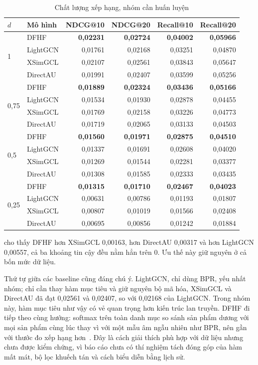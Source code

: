 \begin{table}[H]
\centering
\small
\begin{tabular}{@{}llrrrr@{}}
\toprule
$d$ & Mô hình & NDCG@10 & NDCG@20 & Recall@10 & Recall@20 \\
\midrule
\multirow{4}{*}{1} & DFHF & \textbf{0,02231} & \textbf{0,02724} & \textbf{0,04002} & \textbf{0,05966} \\
 & LightGCN & 0,01761 & 0,02168 & 0,03251 & 0,04870 \\
 & XSimGCL & 0,02107 & 0,02561 & 0,03843 & 0,05647 \\
 & DirectAU & 0,01991 & 0,02407 & 0,03599 & 0,05256 \\
\midrule
\multirow{4}{*}{0,75} & DFHF & \textbf{0,01889} & \textbf{0,02324} & \textbf{0,03436} & \textbf{0,05166} \\
 & LightGCN & 0,01534 & 0,01930 & 0,02878 & 0,04455 \\
 & XSimGCL & 0,01769 & 0,02158 & 0,03226 & 0,04773 \\
 & DirectAU & 0,01719 & 0,02065 & 0,03133 & 0,04503 \\
\midrule
\multirow{4}{*}{0,5} & DFHF & \textbf{0,01560} & \textbf{0,01971} & \textbf{0,02875} & \textbf{0,04510} \\
 & LightGCN & 0,01337 & 0,01691 & 0,02608 & 0,04020 \\
 & XSimGCL & 0,01269 & 0,01544 & 0,02281 & 0,03377 \\
 & DirectAU & 0,01308 & 0,01585 & 0,02333 & 0,03435 \\
\midrule
\multirow{4}{*}{0,25} & DFHF & \textbf{0,01315} & \textbf{0,01710} & \textbf{0,02467} & \textbf{0,04023} \\
 & LightGCN & 0,00631 & 0,00786 & 0,01193 & 0,01807 \\
 & XSimGCL & 0,00807 & 0,01019 & 0,01566 & 0,02408 \\
 & DirectAU & 0,00695 & 0,00856 & 0,01242 & 0,01884 \\
\bottomrule
\end{tabular}
\caption{Chất lượng xếp hạng, nhóm cần huấn luyện}
\label{tab:trained}
\end{table}

 cho thấy DFHF hơn XSimGCL 0,00163, hơn DirectAU 0,00317 và hơn LightGCN 0,00557, cả ba khoảng tin cậy đều nằm hẳn trên 0. Ưu thế này giữ nguyên ở cả bốn mức dữ liệu.

Thứ tự giữa các baseline cũng đáng chú ý. LightGCN, chỉ dùng BPR, yếu nhất nhóm; chỉ cần thay hàm mục tiêu và giữ nguyên bộ mã hóa, XSimGCL và DirectAU đã đạt 0,02561 và 0,02407, so với 0,02168 của LightGCN. Trong nhóm này, hàm mục tiêu như vậy có vẻ quan trọng hơn kiến trúc lan truyền. DFHF đi tiếp theo cùng hướng: softmax trên toàn danh mục so sánh sản phẩm dương với mọi sản phẩm cùng lúc thay vì với một mẫu âm ngẫu nhiên như BPR, nên gần với thước đo xếp hạng hơn~\cite{liang2018multvae}. Đây là cách giải thích phù hợp với dữ liệu nhưng chưa được kiểm chứng, vì báo cáo chưa có thí nghiệm tách đóng góp của hàm mất mát, bộ lọc khuếch tán và cách biểu diễn bằng lịch sử.

